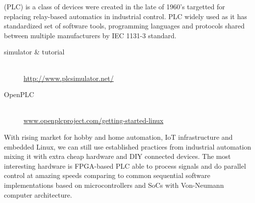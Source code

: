 \clearpage
{}\secdown

 (PLC) is a class of devices were created in
the late of 1960's targetted for replacing relay-based automatics in industrial
control. PLC widely used as it has standardized set of software tools,
programming languages and protocols shared between multiple manufacturers by IEC
1131-3 standard.

\begin{description}
\item[simulator \& tutorial]\ \\
\url{http://www.plcsimulator.net/}
\item[OpenPLC]\ \\
\url{www.openplcproject.com/getting-started-linux}
\end{description}

\pg With rising market for hobby and home automation, IoT infrastructure and
embedded Linux, we can still use established practices from industrial
automation mixing it with extra cheap hardware and DIY connected devices. The
most interesting hardware is FPGA-based PLC able to process signals and do
parallel control at amazing speeds comparing to common sequential software
implementations based on microcontrollers and SoCs with Von-Neumann computer
architecture.



\secup
